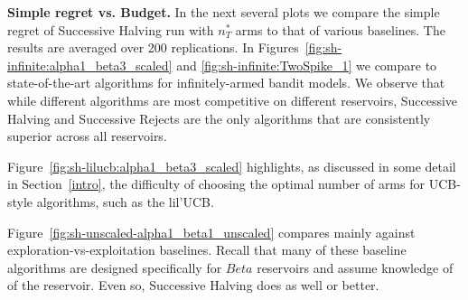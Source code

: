
\textbf{Simple regret vs. Budget.} 
In the next several plots we compare the simple regret of
Successive Halving run with $n^*_T$ arms to that of various baselines. The results are averaged over 200 replications.
In Figures~\ref{fig:sh-infinite:alpha1_beta3_scaled}
and \ref{fig:sh-infinite:TwoSpike_1}
we compare to state-of-the-art algorithms for infinitely-armed bandit models. 
We observe that while different algorithms are most competitive on different reservoirs, Successive Halving and Successive Rejects are the only algorithms that are consistently superior across all reservoirs.

 
Figure~\ref{fig:sh-lilucb:alpha1_beta3_scaled} highlights, as discussed in some detail in Section~\ref{intro}, the difficulty of
choosing the optimal number of arms for UCB-style algorithms,
such as the lil'UCB.

Figure~\ref{fig:sh-unscaled-alpha1_beta1_unscaled} compares mainly against exploration-vs-exploitation baselines.
Recall that many of these baseline algorithms are designed specifically for $Beta$ reservoirs and assume knowledge of
of the reservoir. Even so, Successive Halving does as well or better. 


